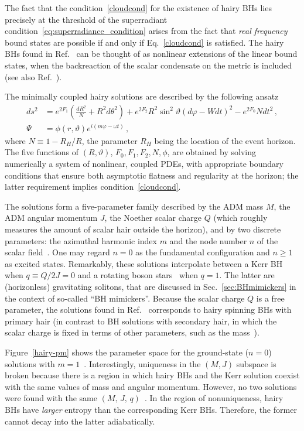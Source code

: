\documentclass[11pt]{article}
\numberwithin{equation}{section} %
\begin{document}
The fact that the condition~\eqref{cloudcond} for the existence of hairy BHs lies
precisely at the threshold of the superradiant condition~\eqref{eq:superradiance_condition} arises from the fact that 
\textit{real frequency} bound states are possible if and only if Eq.~\eqref{cloudcond} is satisfied. The hairy BHs found 
in Ref.~\cite{Herdeiro:2014goa} can be thought of as
nonlinear extensions of the linear bound states, when the backreaction of the scalar condensate on the metric is 
included (see also Ref.~\cite{Herdeiro:2014ima}).


The minimally coupled hairy solutions are described by the following ansatz~\cite{Herdeiro:2014goa} 
%
\begin{align}
\label{ansatz_hairy}
ds^2&=e^{2F_1}\left(\frac{dR^2}{N }+R^2 d\theta^2\right)+e^{2F_2}R^2 \sin^2\vartheta (d\varphi-W dt)^2-e^{2F_0} N 
dt^2\,, \nonumber \\
\Psi&=\phi(r,\vartheta)e^{i(m\varphi-\omega t)}\,,
\end{align} 
%
where $N\equiv 1-{R_H}/{R}$, the parameter $R_H$ being the location of the event horizon. The five functions of 
$(R,\vartheta)$, $F_0,F_1,F_2,N,\phi$, are obtained by solving numerically a system of nonlinear, coupled PDEs, with 
appropriate boundary conditions that
ensure both asymptotic flatness and regularity at the horizon; the latter requirement implies 
condition~\eqref{cloudcond}. 

The solutions form a five-parameter family described by the ADM mass $M$, the ADM angular momentum $J$, the Noether 
scalar charge $Q$ (which roughly measures the amount of scalar hair outside the horizon), and by two discrete 
parameters: the azimuthal harmonic index $m$ and the node number $n$ of the scalar field~\cite{Herdeiro:2014goa}. One 
may regard $n=0$ as the fundamental configuration and $n\ge 1$ as excited states. 
%
Remarkably, these solutions interpolate between a Kerr BH when $q\equiv Q/2J=0$ and a rotating boson 
stars~\cite{Yoshida:1997qf,Kleihaus:2005me} when $q=1$. The latter are (horizonless)
gravitating solitons, that are discussed in Sec.~\ref{sec:BHmimickers} in the context of so-called ``BH mimickers''. 
Because the scalar charge $Q$ is a free parameter, the solutions found in Ref.~\cite{Herdeiro:2014goa} corresponds to 
hairy spinning BHs with primary hair (in contrast to BH solutions with secondary hair, in which the scalar charge is 
fixed in terms of other parameters, such as the mass~\cite{Berti:2015itd}).

Figure~\ref{hairy-pm} shows the parameter space for the ground-state ($n=0$) solutions with 
$m=1$~\cite{Herdeiro:2014goa}. Interestingly, uniqueness in the $(M,J)$ subspace is broken because there is a region in 
which hairy BHs and the Kerr solution coexist with the same values of mass and angular momentum.  However, no two 
solutions were found with the same
$(M,\,J,\,q)$~\cite{Herdeiro:2014goa}. In the region of nonuniqueness, hairy BHs have
\textit{larger} entropy than the corresponding Kerr BHs. Therefore, the
former cannot decay into the latter adiabatically.
\end{document}
